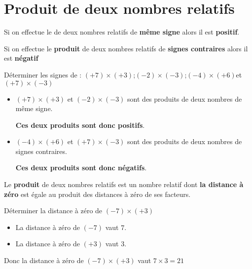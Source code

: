 \section{Produit de deux nombres relatifs}

\begin{propriete}
  Si on effectue le \textbf{} de deux nombres relatifs de \textbf{m\^{e}me signe} alors il est \textbf{positif}.
\end{propriete}

\begin{propriete}
  Si on effectue le \textbf{produit} de deux nombres relatifs de \textbf{signes contraires} alors il est \textbf{n\'egatif}
\end{propriete}

\begin{exemple*1}
  Déterminer les signes de : $(+7)\times (+3)$\hfill ;\hfill$(-2)\times(-3)$\hfill ;\hfill $(-4)\times(+6)$\hfill et \hfill $(+7)\times(-3)$
  \correction
  \begin{itemize}
    \item $(+7)\times (+3)$ et $(-2)\times(-3)$ sont des produits de deux nombres de même signe.
    
    \textbf{Ces deux produits sont donc positifs}.
    \item $(-4)\times(+6)$ et $(+7)\times(-3)$ sont des produits de deux nombres de signes contraires.
    
    \textbf{Ces deux produits sont donc négatifs}.
  \end{itemize}
\end{exemple*1}

\begin{propriete}
  Le \textbf{produit} de deux nombres relatifs est un nombre relatif dont \textbf{la distance à zéro} est égale au produit des distances à zéro de ses facteurs.
\end{propriete}

\begin{exemple*1}
  Déterminer la distance à zéro de $(-7)\times (+3)$
  \correction
  \begin{itemize}
    \item La distance à zéro de $(-7)$ vaut $7$.
    \item La distance à zéro de $(+3)$ vaut $3$.
  \end{itemize}
  Donc la distance à zéro de $(-7)\times (+3)$ vaut $7\times 3= 21$
\end{exemple*1}

